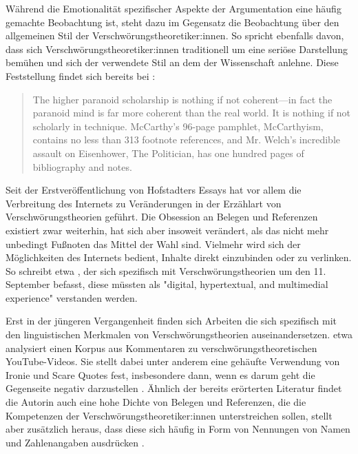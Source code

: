 Während die Emotionalität spezifischer Aspekte der Argumentation eine häufig gemachte Beobachtung ist, steht dazu im Gegensatz die Beobachtung über den allgemeinen Stil der Verschwörungstheoretiker:innen.
So spricht ebenfalls \textcite[][61]{butter_2018} davon, dass sich Verschwörungstheoretiker:innen traditionell um eine seriöse Darstellung bemühen und sich der verwendete Stil an dem der Wissenschaft anlehne.
Diese Feststellung findet sich bereits bei \textcite{hofstadter_2008}:

\begin{quotation}
    The higher paranoid scholarship is nothing if not coherent—in fact the paranoid mind is far more coherent than the real world. It is nothing if not scholarly in technique. McCarthy’s 96-page pamphlet, McCarthyism, contains no less than 313 footnote references, and Mr. Welch’s incredible assault on Eisenhower, The Politician, has one hundred pages of bibliography and notes. \parencite[][37]{hofstadter_2008}
\end{quotation}

Seit der Erstveröffentlichung von Hofstadters Essays hat vor allem die Verbreitung des Internets zu Veränderungen in der Erzählart von Verschwörungstheorien geführt.
Die Obsession an Belegen und Referenzen existiert zwar weiterhin, hat sich aber insoweit verändert, als das nicht mehr unbedingt Fußnoten das Mittel der Wahl sind.
Vielmehr wird sich der Möglichkeiten des Internets bedient, Inhalte direkt einzubinden oder zu verlinken.
So schreibt etwa \textcite{soukup_2008}, der sich spezifisch mit Verschwörungstheorien um den 11. September befasst, diese müssten als "digital, hypertextual, and multimedial experience" \parencite[10]{soukup_2008} verstanden werden.

Erst in der jüngeren Vergangenheit finden sich Arbeiten die sich spezifisch mit den linguistischen Merkmalen von Verschwörungstheorien auseinandersetzen.
\textcite{schafer_2018} etwa analysiert einen Korpus aus Kommentaren zu verschwörungstheoretischen YouTube-Videos.
Sie stellt dabei unter anderem eine gehäufte Verwendung von Ironie und Scare Quotes fest, insbesondere dann, wenn es darum geht die Gegenseite negativ darzustellen \parencite[235]{schafer_2018}.
Ähnlich der bereits erörterten Literatur findet die Autorin auch eine hohe Dichte von Belegen und Referenzen, die die Kompetenzen der Verschwörungstheoretiker:innen unterstreichen sollen, stellt aber zusätzlich heraus, dass diese sich häufig in Form von Nennungen von Namen und Zahlenangaben ausdrücken \parencite[234]{schafer_2018}.


